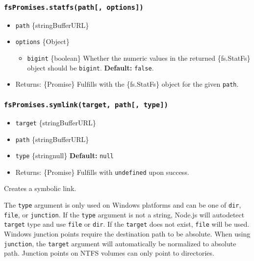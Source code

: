 \subsubsection{\texorpdfstring{\texttt{fsPromises.statfs(path{[},\ options{]})}}{fsPromises.statfs(path{[}, options{]})}}\label{fspromises.statfspath-options}

\begin{itemize}
\tightlist
\item
  \texttt{path} \{string\textbar Buffer\textbar URL\}
\item
  \texttt{options} \{Object\}

  \begin{itemize}
  \tightlist
  \item
    \texttt{bigint} \{boolean\} Whether the numeric values in the
    returned \{fs.StatFs\} object should be \texttt{bigint}.
    \textbf{Default:} \texttt{false}.
  \end{itemize}
\item
  Returns: \{Promise\} Fulfills with the \{fs.StatFs\} object for the
  given \texttt{path}.
\end{itemize}

\subsubsection{\texorpdfstring{\texttt{fsPromises.symlink(target,\ path{[},\ type{]})}}{fsPromises.symlink(target, path{[}, type{]})}}\label{fspromises.symlinktarget-path-type}

\begin{itemize}
\tightlist
\item
  \texttt{target} \{string\textbar Buffer\textbar URL\}
\item
  \texttt{path} \{string\textbar Buffer\textbar URL\}
\item
  \texttt{type} \{string\textbar null\} \textbf{Default:} \texttt{null}
\item
  Returns: \{Promise\} Fulfills with \texttt{undefined} upon success.
\end{itemize}

Creates a symbolic link.

The \texttt{type} argument is only used on Windows platforms and can be
one of \texttt{\textquotesingle{}dir\textquotesingle{}},
\texttt{\textquotesingle{}file\textquotesingle{}}, or
\texttt{\textquotesingle{}junction\textquotesingle{}}. If the
\texttt{type} argument is not a string, Node.js will autodetect
\texttt{target} type and use
\texttt{\textquotesingle{}file\textquotesingle{}} or
\texttt{\textquotesingle{}dir\textquotesingle{}}. If the \texttt{target}
does not exist, \texttt{\textquotesingle{}file\textquotesingle{}} will
be used. Windows junction points require the destination path to be
absolute. When using
\texttt{\textquotesingle{}junction\textquotesingle{}}, the
\texttt{target} argument will automatically be normalized to absolute
path. Junction points on NTFS volumes can only point to directories.

